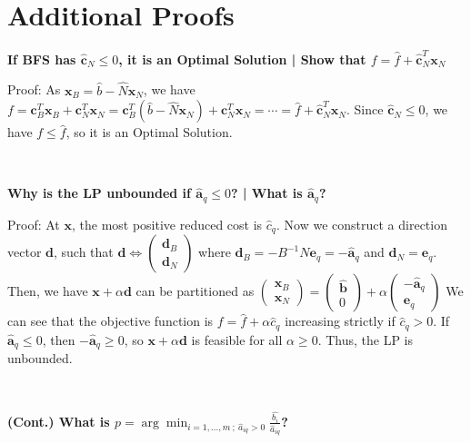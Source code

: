 \documentclass[9pt]{article}
\begin{document}
\section{Additional Proofs}

\scriptsize

\textbf{If BFS has $\widehat{\mathbf{c}}_N\leq0$, it is an \textbf{Optimal Solution} | Show that $f=\widehat{f}+\widehat{\mathbf{c}}_N^T\mathbf{x}_N$}

Proof: As $\mathbf{x}_B=\widehat{b}-\widehat{N}\mathbf{x}_N$, we have $f=\mathbf{c}_B^T\mathbf{x}_B+\mathbf{c}_N^T\mathbf{x}_N=\mathbf{c}_B^T(\widehat{b}-\widehat{N}\mathbf{x}_N)+\mathbf{c}_N^T\mathbf{x}_N=\cdots=\widehat{f}+\widehat{\mathbf{c}}_N^T\mathbf{x}_N$.
Since $\widehat{\mathbf{c}}_N\leq0$, we have $f\leq\widehat{f}$, so it is an Optimal Solution.

~

\textbf{Why is the LP unbounded if $\widehat{\mathbf{a}}_q\leq0$? | What is $\widehat{\mathbf{a}}_q$?}

Proof: At $\mathbf{x}$, the most positive reduced cost is $\widehat{c}_q$. Now we construct a direction vector $\mathbf{d}$, such that $\mathbf{d}\Leftrightarrow\begin{pmatrix}\mathbf{d}_B \\ \mathbf{d}_N\end{pmatrix}$ where $\mathbf{d}_B=-B^{-1}N\mathbf{e}_q=-\widehat{\mathbf{a}}_q$ and $\mathbf{d}_N=\mathbf{e}_q$.
Then, we have $\mathbf{x}+\alpha\mathbf{d}$ can be partitioned as $\begin{pmatrix}\mathbf{x}_B \\ \mathbf{x}_N\end{pmatrix}=\begin{pmatrix}\widehat{\mathbf{b}} \\ 0\end{pmatrix}+\alpha\begin{pmatrix}-\widehat{\mathbf{a}}_q \\ \mathbf{e}_q\end{pmatrix}$
We can see that the objective function is $f=\widehat{f}+\alpha\widehat{c}_q$ increasing strictly if $\widehat{c}_q>0$. \qquad \qquad If $\widehat{\mathbf{a}}_q\le0$, then $-\widehat{\mathbf{a}}_q\ge0$, so $\mathbf{x}+\alpha\mathbf{d}$ is feasible for all $\alpha\ge0$. Thus, the LP is unbounded.

~

\textbf{(Cont.) What is $p=\arg\min_{i=1,...,m \ ; \ \widehat{a}_{iq}>0}\frac{\widehat{b_i}}{\widehat{a}_{iq}}$?}
\end{document}
